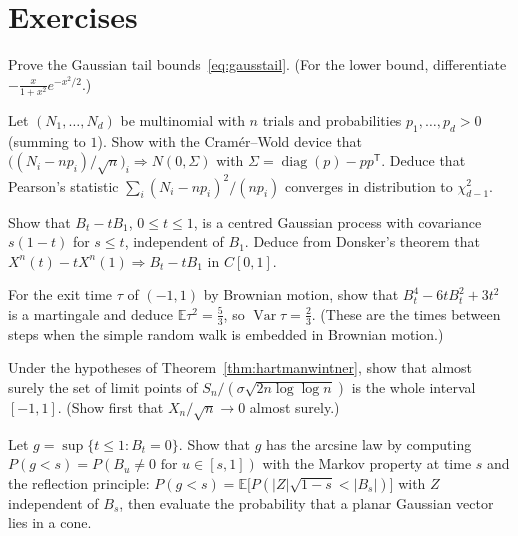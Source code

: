 \section{Exercises}

\begin{exercise}[$\star$]\label{ex:gausstail}
Prove the Gaussian tail bounds~\eqref{eq:gausstail}. (For the lower bound, differentiate $-\frac x{1+x^2}e^{-x^2/2}$.)
\end{exercise}

\begin{exercise}[$\star$]\label{ex:multinomial}
Let $(N_1,\dots,N_d)$ be multinomial with $n$ trials and probabilities $p_1,\dots,p_d>0$ (summing to $1$). Show with the Cram\'er--Wold device that $\bigl((N_i-np_i)/\sqrt n\bigr)_i\Rightarrow N(0,\Sigma)$
with $\Sigma=\operatorname{diag}(p)-pp^{\mathsf T}$. Deduce that Pearson's statistic $\sum_i(N_i-np_i)^2/(np_i)$ converges in distribution to $\chi^2_{d-1}$.
\end{exercise}

\begin{exercise}[$\star$]\label{ex:bridge}
Show that $B_t-tB_1$, $0\le t\le1$, is a centred Gaussian process with covariance $s(1-t)$ for $s\le t$, independent of $B_1$. Deduce from Donsker's theorem that
$X^n(t)-tX^n(1)\Rightarrow B_t-tB_1$ in $C[0,1]$.
\end{exercise}

\begin{exercise}[$\star\star$]\label{ex:exitvar}
For the exit time $\tau$ of $(-1,1)$ by Brownian motion, show that $B_t^4-6tB_t^2+3t^2$ is a martingale and deduce $\mathbb E\tau^2=\frac53$, so $\operatorname{Var}\tau=\frac23$. (These
are the times between steps when the simple random walk is embedded in Brownian motion.)
\end{exercise}

\begin{exercise}[$\star\star$]\label{ex:clusterset}
Under the hypotheses of Theorem~\ref{thm:hartmanwintner}, show that almost surely the set of limit points of $S_n/(\sigma\sqrt{2n\log\log n})$ is the whole interval $[-1,1]$.
(Show first that $X_n/\sqrt n\to0$ almost surely.)
\end{exercise}

\begin{exercise}[$\star\star$]\label{ex:lastzero}
Let $g=\sup\{t\le1:B_t=0\}$. Show that $g$ has the arcsine law by computing $P(g<s)=P(B_u\ne0\text{ for }u\in[s,1])$ with the Markov property at time $s$ and the reflection
principle: $P(g<s)=\mathbb E\bigl[P(|Z|\sqrt{1-s}<|B_s|)\bigr]$ with $Z$ independent of $B_s$, then evaluate the probability that a planar Gaussian vector lies in a cone.
\end{exercise}

